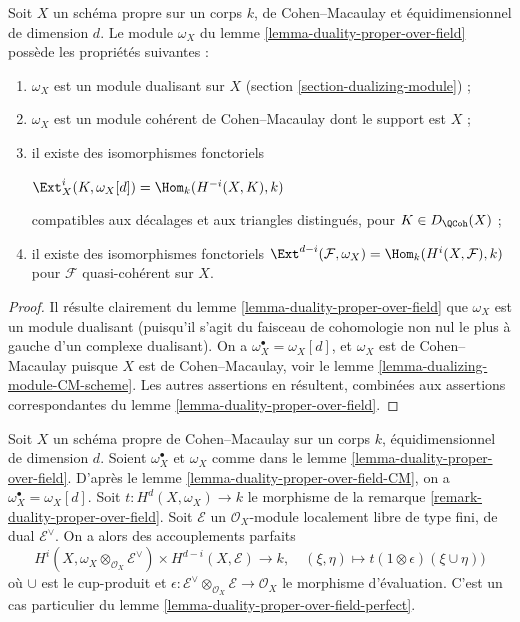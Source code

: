 \begin{lemma}
\label{lemma-duality-proper-over-field-CM}
Soit $X$ un schéma propre sur un corps $k$, de Cohen–Macaulay et équidimensionnel de dimension $d$. Le module $\omega_X$ du lemme \ref{lemma-duality-proper-over-field} possède les propriétés suivantes :
\begin{enumerate}
\item $\omega_X$ est un module dualisant sur $X$ (section \ref{section-dualizing-module}) ;
\item $\omega_X$ est un module cohérent de Cohen–Macaulay dont le support est $X$ ;
\item il existe des isomorphismes fonctoriels
\par\noindent\hfil
$\Ext^i_X(K, \omega_X[d]) = \Hom_k(H^{-i}(X, K), k)$
\hfil\par\noindent
compatibles aux décalages et aux triangles distingués, pour $K \in D_\QCoh(X)$ ;
\item il existe des isomorphismes fonctoriels
$\Ext^{d - i}(\mathcal{F}, \omega_X) = \Hom_k(H^i(X, \mathcal{F}), k)$
pour $\mathcal{F}$ quasi-cohérent sur $X$.
\end{enumerate}
\end{lemma}

\begin{proof}
Il résulte clairement du lemme \ref{lemma-duality-proper-over-field} que $\omega_X$ est un module dualisant (puisqu'il s'agit du faisceau de cohomologie non nul le plus à gauche d'un complexe dualisant). On a $\omega_X^\bullet = \omega_X[d]$, et $\omega_X$ est de Cohen–Macaulay puisque $X$ est de Cohen–Macaulay, voir le lemme \ref{lemma-dualizing-module-CM-scheme}. Les autres assertions en résultent, combinées aux assertions correspondantes du lemme \ref{lemma-duality-proper-over-field}.
\end{proof}

\begin{remark}
\label{remark-rework-duality-locally-free-CM}
Soit $X$ un schéma propre de Cohen–Macaulay sur un corps $k$, équidimensionnel de dimension $d$. Soient $\omega_X^\bullet$ et $\omega_X$ comme dans le lemme \ref{lemma-duality-proper-over-field}. D'après le lemme \ref{lemma-duality-proper-over-field-CM}, on a $\omega_X^\bullet = \omega_X[d]$. Soit $t : H^d(X, \omega_X) \to k$ le morphisme de la remarque \ref{remark-duality-proper-over-field}. Soit $\mathcal{E}$ un $\mathcal{O}_X$-module localement libre de type fini, de dual $\mathcal{E}^\vee$. On a alors des accouplements parfaits
$$
H^i(X, \omega_X \otimes_{\mathcal{O}_X} \mathcal{E}^\vee)
\times
H^{d - i}(X, \mathcal{E})
\longrightarrow
k,\quad
(\xi, \eta) \longmapsto t(1 \otimes \epsilon)(\xi \cup \eta))
$$
où $\cup$ est le cup-produit et $\epsilon : \mathcal{E}^\vee \otimes_{\mathcal{O}_X} \mathcal{E}
\to \mathcal{O}_X$ le morphisme d'évaluation. C'est un cas particulier du lemme \ref{lemma-duality-proper-over-field-perfect}.
\end{remark}


